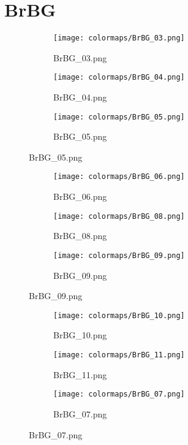 \documentclass{article}%
\begin{document}
%
\newpage%
\section{BrBG}%
\label{sec:BrBG}%
\hspace{1cm}\hfill%
\hspace{1cm}\hfill%
\hspace{1cm}\hfill%


\begin{figure}[h!]%
\begin{subfigure}[b]{0.3\linewidth}%
\texttt{[image: colormaps/BrBG\_03.png]}%
\caption{BrBG\_03.png}%
\end{subfigure}%
\begin{subfigure}[b]{0.3\linewidth}%
\texttt{[image: colormaps/BrBG\_04.png]}%
\caption{BrBG\_04.png}%
\end{subfigure}%
\begin{subfigure}[b]{0.3\linewidth}%
\texttt{[image: colormaps/BrBG\_05.png]}%
\caption{BrBG\_05.png}%
\end{subfigure}%
\end{figure}

%
\hspace{1cm}\hfill%
\hspace{1cm}\hfill%
\hspace{1cm}\hfill%


\begin{figure}[h!]%
\begin{subfigure}[b]{0.3\linewidth}%
\texttt{[image: colormaps/BrBG\_06.png]}%
\caption{BrBG\_06.png}%
\end{subfigure}%
\begin{subfigure}[b]{0.3\linewidth}%
\texttt{[image: colormaps/BrBG\_08.png]}%
\caption{BrBG\_08.png}%
\end{subfigure}%
\begin{subfigure}[b]{0.3\linewidth}%
\texttt{[image: colormaps/BrBG\_09.png]}%
\caption{BrBG\_09.png}%
\end{subfigure}%
\end{figure}

%
\hspace{1cm}\hfill%
\hspace{1cm}\hfill%
\hspace{1cm}\hfill%


\begin{figure}[h!]%
\begin{subfigure}[b]{0.3\linewidth}%
\texttt{[image: colormaps/BrBG\_10.png]}%
\caption{BrBG\_10.png}%
\end{subfigure}%
\begin{subfigure}[b]{0.3\linewidth}%
\texttt{[image: colormaps/BrBG\_11.png]}%
\caption{BrBG\_11.png}%
\end{subfigure}%
\begin{subfigure}[b]{0.3\linewidth}%
\texttt{[image: colormaps/BrBG\_07.png]}%
\caption{BrBG\_07.png}%
\end{subfigure}%
\end{figure}
\end{document}
